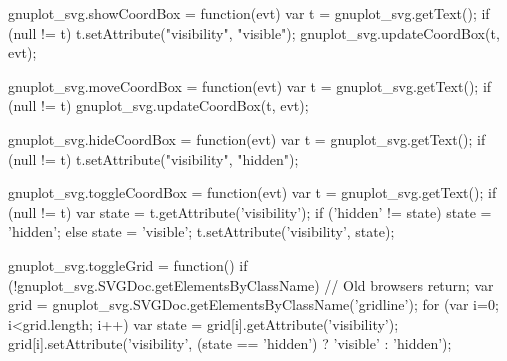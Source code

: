 gnuplot_svg.showCoordBox = function(evt) {
    var t = gnuplot_svg.getText();
    if (null != t) {
    	t.setAttribute("visibility", "visible");
    	gnuplot_svg.updateCoordBox(t, evt);
    }
}

gnuplot_svg.moveCoordBox = function(evt) {
    var t = gnuplot_svg.getText();
    if (null != t)
    	gnuplot_svg.updateCoordBox(t, evt);
}

gnuplot_svg.hideCoordBox = function(evt) {
    var t = gnuplot_svg.getText();
    if (null != t)
    	t.setAttribute("visibility", "hidden");
}

gnuplot_svg.toggleCoordBox = function(evt) {
    var t = gnuplot_svg.getText();
    if (null != t) {
	var state = t.getAttribute('visibility');
	if ('hidden' != state)
	    state = 'hidden';
	else
	    state = 'visible';
	t.setAttribute('visibility', state);
    }
}

gnuplot_svg.toggleGrid = function() {
    if (!gnuplot_svg.SVGDoc.getElementsByClassName) // Old browsers
	return;
    var grid = gnuplot_svg.SVGDoc.getElementsByClassName('gridline');
    for (var i=0; i<grid.length; i++) {
	var state = grid[i].getAttribute('visibility');
	grid[i].setAttribute('visibility', (state == 'hidden') ? 'visible' : 'hidden');
    }
}

